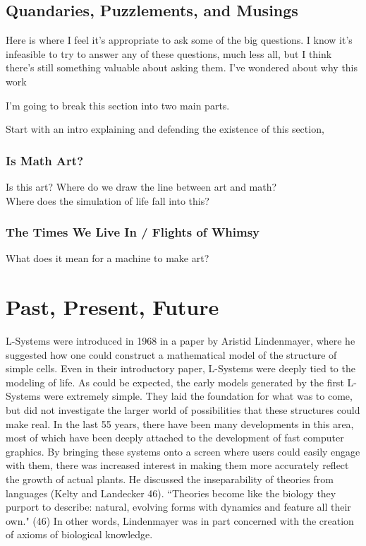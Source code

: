 \documentclass[12pt,twoside]{reedthesis}
\begin{document}
\section{Quandaries, Puzzlements, and Musings}

Here is where I feel it's appropriate to ask some of the big questions. I know it's infeasible to try to answer any of these questions, much less all, but I think there's still something valuable about asking them. I've wondered about why this work 

I'm going to break this section into two main parts.

Start with an intro explaining and defending the existence of this section,\\

\subsection{Is Math Art?}

Is this art? Where do we draw the line between art and math?\\
Where does the simulation of life fall into this?

\subsection{The Times We Live In / Flights of Whimsy}

What does it mean for a machine to make art?\\


\chapter{Past, Present, Future}

	L-Systems were introduced in 1968 in a paper by Aristid Lindenmayer, where he suggested how one could construct a mathematical model of the structure of simple cells. Even in their introductory paper, L-Systems were deeply tied to the modeling of life. As could be expected, the early models generated by the first L-Systems were extremely simple. They laid the foundation for what was to come, but did not investigate the larger world of possibilities that these structures could make real. In the last 55 years, there have been many developments in this area, most of which have been deeply attached to the development of fast computer graphics. By bringing these systems onto a screen where users could easily engage with them, there was increased interest in making them more accurately reflect the growth of actual plants. He discussed the inseparability of theories from languages (Kelty and Landecker 46). ``Theories become like the biology they purport to describe: natural, evolving forms with dynamics and feature all their own." (46) In other words, Lindenmayer was in part concerned with the creation of axioms of biological knowledge.\\
	
\end{document}

